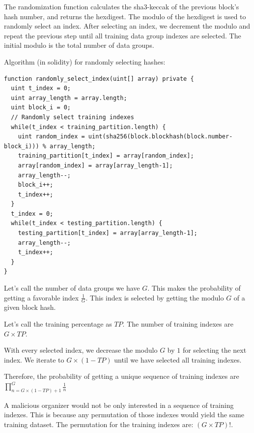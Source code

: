 \documentclass{article}
\begin{document}
The randomization function calculates the sha3-keccak of the previous block's hash number, and returns the hexdigest. The modulo of the hexdigest is used to randomly select an index. After selecting an index, we decrement the modulo and repeat the previous step until all training data group indexes are selected. The initial modulo is the total number of data groups.

Algorithm (in solidity) for randomly selecting hashes:

\begin{lstlisting}[language=Solidity]
function randomly_select_index(uint[] array) private {
  uint t_index = 0;
  uint array_length = array.length;
  uint block_i = 0;
  // Randomly select training indexes
  while(t_index < training_partition.length) {
    uint random_index = uint(sha256(block.blockhash(block.number-block_i))) % array_length;
    training_partition[t_index] = array[random_index];
    array[random_index] = array[array_length-1];
    array_length--;
    block_i++;
    t_index++;
  }
  t_index = 0;
  while(t_index < testing_partition.length) {
    testing_partition[t_index] = array[array_length-1];
    array_length--;
    t_index++;
  }
}
\end{lstlisting}

\begin{flushleft}
  Let’s call the number of data groups we have $G$. This makes the probability of getting a favorable index $\frac{1}{G}$.
  This index is selected by getting the modulo $G$ of a given block hash.
\end{flushleft}

\begin{flushleft}
  Let’s call the training percentage as $TP$. The number of training indexes are $G\times TP$.
\end{flushleft}

\begin{flushleft}
  With every selected index, we decrease the modulo $G$ by $1$ for selecting the next index. We iterate to $G\times (1-TP)$ until we have selected all training indexes.
\end{flushleft}

\begin{flushleft}
  Therefore, the probability of getting a unique sequence of training indexes are $\prod\limits_{n=G\times (1-TP) +1}^{G} \frac{1}{n}$
\end{flushleft}

\begin{flushleft}
  A malicious organizer would not be only interested in a sequence of training indexes. This is because any permutation of those indexes would yield the same training dataset. The permutation for the training indexes are: $(G\times TP)!$.
\end{flushleft}
\end{document}

